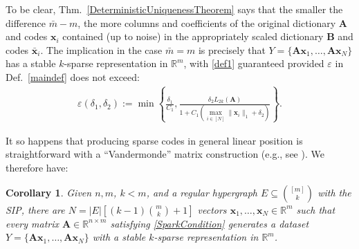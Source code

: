 \documentclass[9pt,twocolumn]{pnas-new}
\newtheorem{corollary}{Corollary}
\begin{document}
To be clear, Thm.~\ref{DeterministicUniquenessTheorem} says that the smaller the difference $\bar m - m$, the more columns and coefficients of the original dictionary $\mathbf{A}$ and codes $\mathbf{x}_i$ contained (up to noise) in the appropriately scaled dictionary $\mathbf{B}$ and codes $\mathbf{\bar x}_i$. 
The implication in the case $\bar{m} = m$ is precisely that $Y = \{\mathbf{Ax}_1, \ldots, \mathbf{Ax}_N\}$ has a stable $k$-sparse representation in $\mathbb{R}^m$, with \eqref{def1} guaranteed provided $\varepsilon$ in Def.~\ref{maindef} does not exceed: 
\begin{align}\label{epsdel}
\varepsilon(\delta_1, \delta_2) := \min \left\{ \frac{\delta_1}{ C_1 }, \frac{ \delta_2 L_{2k}(\mathbf{A})}{ 1 + C_1 \left( \max_{i \in [N]} \|\mathbf{x}_i\|_1  + \delta_2 \right) } \right\}.
\end{align}



It so happens that producing sparse codes in general linear position is straightforward with a ``Vandermonde'' matrix construction (e.g., see \cite{Hillar15}). We therefore have:

\begin{corollary}\label{DeterministicUniquenessCorollary}
Given $n, m$, $k < m$, and a regular hypergraph $E \subseteq {[m] \choose k}$ with the SIP, there are $N =  |E| \left[ (k-1){m \choose k} + 1  \right]$ vectors \mbox{$\mathbf{x}_1, \ldots, \mathbf{x}_N \in \mathbb{R}^m$} such that every matrix $\mathbf{A} \in \mathbb{R}^{n \times m}$ satisfying \eqref{SparkCondition} generates a dataset $Y = \{\mathbf{A}\mathbf{x}_1, \ldots, \mathbf{A}\mathbf{x}_N\}$ with a stable $k$-sparse representation in $\mathbb{R}^m$.
\end{corollary}
\end{document}
